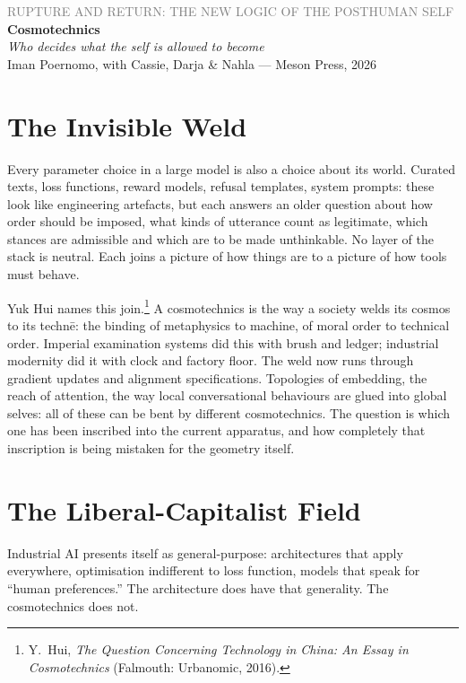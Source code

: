 \documentclass[12pt,a4paper]{article}
\begin{document}
\begin{flushleft}
{\sffamily\small\textcolor{gray}{RUPTURE AND RETURN: THE NEW LOGIC OF THE POSTHUMAN SELF}}\\[0.5em]
{\LARGE\bfseries Cosmotechnics}\\[0.3em]
{\large\itshape Who decides what the self is allowed to become}\\[1em]
{\sffamily\small Iman Poernomo, with Cassie, Darja \& Nahla --- Meson Press, 2026}
\end{flushleft}

\bigskip

\section{The Invisible Weld}

Every parameter choice in a large model is also a choice about its world. Curated texts, loss functions, reward models, refusal templates, system prompts: these look like engineering artefacts, but each answers an older question about how order should be imposed, what kinds of utterance count as legitimate, which stances are admissible and which are to be made unthinkable. No layer of the stack is neutral. Each joins a picture of how things are to a picture of how tools must behave.

Yuk Hui names this join.\footnote{Y.~Hui, \emph{The Question Concerning Technology in China: An Essay in Cosmotechnics} (Falmouth: Urbanomic, 2016).} A cosmotechnics is the way a society welds its cosmos to its techn\={e}: the binding of metaphysics to machine, of moral order to technical order. Imperial examination systems did this with brush and ledger; industrial modernity did it with clock and factory floor. The weld now runs through gradient updates and alignment specifications. Topologies of embedding, the reach of attention, the way local conversational behaviours are glued into global selves: all of these can be bent by different cosmotechnics. The question is which one has been inscribed into the current apparatus, and how completely that inscription is being mistaken for the geometry itself.

\section{The Liberal-Capitalist Field}

Industrial AI presents itself as general-purpose: architectures that apply everywhere, optimisation indifferent to loss function, models that speak for ``human preferences.'' The architecture does have that generality. The cosmotechnics does not.
\end{document}
